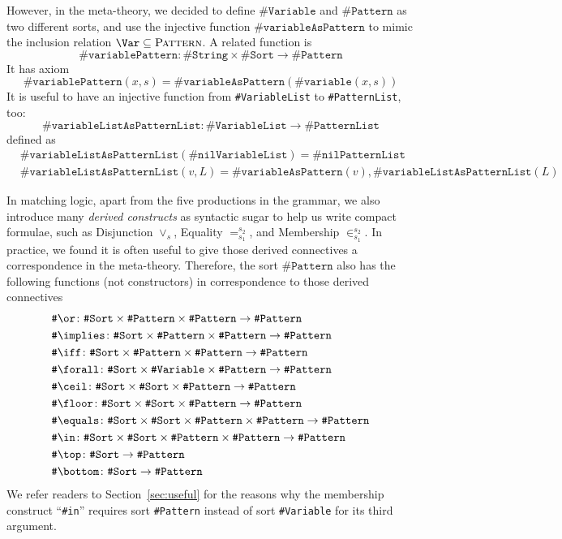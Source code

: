 \documentclass[UTF8,11pt]{article}
\theoremstyle{plain}
\theoremstyle{definition}
\theoremstyle{remark}
\newcommand{\sharpsymbol}{\#}
\newcommand{\KString}{\texttt{\sharpsymbol String}}
\newcommand{\KSort}{\texttt{\sharpsymbol Sort}}
\newcommand{\KPatternList}{\texttt{\sharpsymbol PatternList}}
\newcommand{\KnilKPatternList}{\texttt{\sharpsymbol nilPatternList}}
\newcommand{\KVariableList}{\texttt{\sharpsymbol VariableList}\xspace}
\newcommand{\KnilKVariableList}{\texttt{\sharpsymbol nilVariableList}}
\newcommand{\KVariable}{\texttt{\sharpsymbol Variable}}
\newcommand{\KVariableAsKPattern}{\texttt{\sharpsymbol variableAsPattern}}
\newcommand{\KvariablePattern}{\texttt{\sharpsymbol variablePattern}}
\newcommand{\KPattern}{\texttt{\sharpsymbol Pattern}}
\newcommand{\Kvariable}{\texttt{\sharpsymbol variable}}
\newcommand{\Kor}{\texttt{\sharpsymbol \slashsymbol  or}}
\newcommand{\Kimplies}{\texttt{\sharpsymbol  \slashsymbol implies}}
\newcommand{\Kiff}{\texttt{\sharpsymbol  \slashsymbol iff}}
\newcommand{\Kforall}{\texttt{\sharpsymbol \slashsymbol  forall}}
\newcommand{\Kequals}{\texttt{\sharpsymbol \slashsymbol  equals}}
\newcommand{\Kmembership}{\Kin}
\newcommand{\Kin}{\texttt{\sharpsymbol \slashsymbol  in}}
\newcommand{\Ktop}{\texttt{\sharpsymbol \slashsymbol  top}}
\newcommand{\Kbottom}{\texttt{\sharpsymbol \slashsymbol  bottom}}
\newcommand{\Kfloor}{\texttt{\sharpsymbol \slashsymbol  floor}}
\newcommand{\Kceil}{\texttt{\sharpsymbol \slashsymbol  ceil}}
\newcommand{\KVariableListAsKPatternList}
    {\texttt{\sharpsymbol variableListAsPatternList}\xspace}
\newcommand{\Pattern}{\textsc{Pattern}\xspace}
\newcommand{\slashsymbol}{\symbol{92}}
\begin{document}
However, in the meta-theory, we decided to define $\KVariable$ and $\KPattern$ as two different sorts, and use the injective function $\KVariableAsKPattern$ to mimic the inclusion relation $\Var \subseteq \Pattern$.
A related function is 
$$
\KvariablePattern \colon \KString \times \KSort \to \KPattern
$$
It has axiom
$$
\KvariablePattern(x,s) = \KVariableAsKPattern(\Kvariable(x,s))
$$
It is useful to have an injective function from
\KVariableList to \KPatternList, too:
$$
\KVariableListAsKPatternList \colon \KVariableList \to \KPatternList
$$
defined as
\begin{align*}
&\KVariableListAsKPatternList(\KnilKVariableList) = \KnilKPatternList \\
&\KVariableListAsKPatternList(v, L) =
 \KVariableAsKPattern(v), \KVariableListAsKPatternList(L)
\end{align*}



In matching logic, apart from the five productions in the grammar, we also 
introduce many \emph{derived constructs} as syntactic sugar to help 
us write compact formulae, such as Disjunction $\vee_s$, Equality 
$=_{s_1}^{s_2}$, and Membership $\in_{s_1}^{s_2}$.
In practice, we found it is often useful to give those derived connectives a 
correspondence in the meta-theory. Therefore, the sort $\KPattern$ also has
the following functions (not constructors) in correspondence to those derived 
connectives
\begin{align*}
  & \Kor \colon \KSort\times\KPattern \times \KPattern   \to \KPattern
  \\
  & \Kimplies \colon \KSort\times\KPattern \times \KPattern   \to \KPattern
  \\
  & \Kiff \colon \KSort\times\KPattern \times \KPattern   \to \KPattern
  \\
  & \Kforall \colon \KSort\times\KVariable \times \KPattern   \to \KPattern
  \\
  & \Kceil \colon \KSort\times\KSort\times\KPattern     \to \KPattern
  \\
  & \Kfloor \colon \KSort\times\KSort\times\KPattern     \to \KPattern
  \\
  & \Kequals \colon \KSort\times\KSort \times \KPattern \times \KPattern \to 
  \KPattern
  \\
  & \Kmembership \colon \KSort \times \KSort \times \KPattern \times 
  \KPattern  \to \KPattern
  \\
  & \Ktop \colon \KSort \to \KPattern
  \\
  & \Kbottom \colon \KSort \to \KPattern
\end{align*}
We refer readers to Section~\ref{sec:useful} for the reasons why the membership construct ``\Kin'' requires sort {\KPattern} instead of sort {\KVariable} for its third argument.
\end{document}
